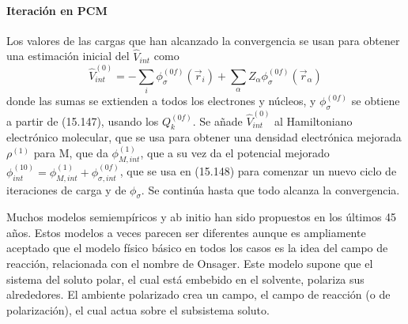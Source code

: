 
\paragraph{Iteraci\'on en PCM} Los valores de las cargas que han
alcanzado la convergencia se usan para obtener una estimaci\'on 
inicial del $\hat V_{int}$ como
$$\hat V^{(0)}_{int}=-\sum_i\phi^{(0f)}_{\sigma}(\vec r_i)+
\sum_{\alpha}Z_{\alpha}\phi^{(0f)}_{\sigma}(\vec r_{\alpha})$$ 
donde las sumas se extienden a todos los electrones y n\'ucleos, y
$\phi^{(0f)}_{\sigma}$ se obtiene a partir de (15.147), usando los
$Q^{(0f)}_k$. Se a\~nade $\hat V^{(0)}_{int}$ al Hamiltoniano 
electr\'onico molecular, que se usa para obtener una densidad 
electr\'onica mejorada $\rho^{(1)}$ para M, que da 
$\phi^{(1)}_{M,int}$, que a su vez da el potencial mejorado
$\phi^{(10)}_{int}=\phi^{(1)}_{M,int}+\phi^{(0f)}_{\sigma,int}$, que
se usa en (15.148) para comenzar un nuevo ciclo de iteraciones de 
carga y de $\phi_{\sigma}$. Se contin\'ua hasta que todo alcanza la
convergencia.

Muchos modelos semiemp\'iricos y ab initio han sido propuestos en los
\'ultimos 45 a\~nos. Estos modelos a veces parecen ser diferentes 
aunque es ampliamente aceptado que el modelo f\'isico b\'asico en 
todos los casos es la idea del campo de reacci\'on, relacionada con 
el nombre de Onsager. Este modelo supone que el sistema del soluto 
polar, el cual est\'a embebido en el solvente, polariza sus 
alrededores. El ambiente polarizado crea un campo, el campo de 
reacci\'on (o de polarizaci\'on), el cual actua sobre el subsistema
soluto.
